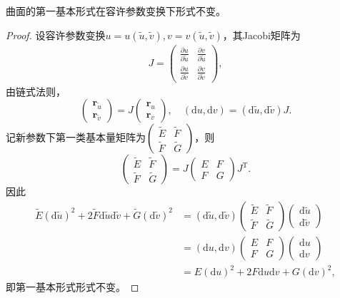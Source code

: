 \documentclass[../../main.tex]{subfiles}%
\begin{document}
\begin{proposition}
曲面的第一基本形式在容许参数变换下形式不变。
\end{proposition}
\begin{proof}

设容许参数变换$u=u(\tilde{u},\tilde{v}),v=v(\tilde{u},\tilde{v})$，其Jacobi矩阵为
\begin{align}
J=\begin{pmatrix}
\frac{\partial u}{\partial\tilde{u}}&\frac{\partial v}{\partial\tilde{u}}\\
\frac{\partial u}{\partial\tilde{v}}&\frac{\partial v}{\partial\tilde{v}}
\end{pmatrix},\label{eq:jacobi}
\end{align}
由链式法则，
\[
\begin{pmatrix}\boldsymbol{r}_{\tilde{u}}\\\boldsymbol{r}_{\tilde{v}}\end{pmatrix}=J\begin{pmatrix}\boldsymbol{r}_u\\\boldsymbol{r}_v\end{pmatrix},\quad (\mathrm{d}u,\mathrm{d}v)=(\mathrm{d}\tilde{u},\mathrm{d}\tilde{v})J.
\]
记新参数下第一类基本量矩阵为$\begin{pmatrix}\tilde{E}&\tilde{F}\\\tilde{F}&\tilde{G}\end{pmatrix}$，则
\[
\begin{pmatrix}\tilde{E}&\tilde{F}\\\tilde{F}&\tilde{G}\end{pmatrix}=J\begin{pmatrix}E&F\\F&G\end{pmatrix}J^\mathrm{T}.
\]
因此
\begin{align*}
\tilde{E}(\mathrm{d}\tilde{u})^2+2\tilde{F}\mathrm{d}\tilde{u}\mathrm{d}\tilde{v}+\tilde{G}(\mathrm{d}\tilde{v})^2
&=(\mathrm{d}\tilde{u},\mathrm{d}\tilde{v})\begin{pmatrix}\tilde{E}&\tilde{F}\\\tilde{F}&\tilde{G}\end{pmatrix}\begin{pmatrix}\mathrm{d}\tilde{u}\\\mathrm{d}\tilde{v}\end{pmatrix}\\
&=(\mathrm{d}u,\mathrm{d}v)\begin{pmatrix}E&F\\F&G\end{pmatrix}\begin{pmatrix}\mathrm{d}u\\\mathrm{d}v\end{pmatrix}\\
&=E(\mathrm{d}u)^2+2F\mathrm{d}u\mathrm{d}v+G(\mathrm{d}v)^2,
\end{align*}
即第一基本形式形式不变。

\end{proof}
\end{document}
